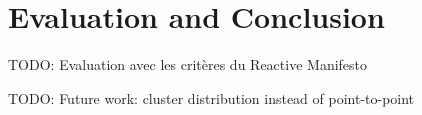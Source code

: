 \chapter{Evaluation and Conclusion}

TODO: Evaluation avec les critères du Reactive Manifesto


TODO: Future work: cluster distribution instead of point-to-point




